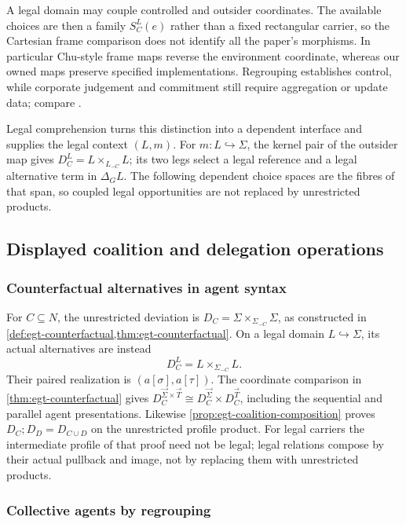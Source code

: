 \documentclass[11pt,a4paper]{article}
\numberwithin{equation}{section}
\theoremstyle{definition}
\theoremstyle{remark}
\theoremstyle{plain}
\providecommand{\sig}{\vec{\Sigma}}
\providecommand{\taus}{\vec{T}}
\begin{document}
A legal domain may couple controlled and outsider coordinates. The
available choices are then a family $S_C^L(e)$ rather than a fixed
rectangular carrier, so the Cartesian frame comparison does not identify
all the paper's morphisms. In particular Chu-style frame maps reverse the
environment coordinate, whereas our owned maps preserve specified
implementations. Regrouping establishes control, while corporate
judgement and commitment still require aggregation or update data; compare
\citet{ListPettit2011GroupAgency}.

Legal comprehension turns this distinction into a dependent
interface and supplies the legal context $(L,m)$. For
$m:L\hookrightarrow\Sigma$, the kernel pair of the
outsider map gives
$D_C^L=L\times_{L_{-C}}L$; its two legs select a legal reference
and a legal alternative term in $\Delta_GL$. The following dependent
choice spaces are the
fibres of that span, so coupled legal opportunities are not replaced by
unrestricted products.

\subsection{Displayed coalition and delegation operations}
\label{agt-sec-ownership}

\subsubsection{Counterfactual alternatives in agent syntax}

For $C\subseteq N$, the unrestricted deviation is
$D_C=\Sigma\times_{\Sigma_{-C}}\Sigma$, as constructed in
\cref{def:egt-counterfactual,thm:egt-counterfactual}.
On a legal domain $L\hookrightarrow\Sigma$, its actual alternatives
are instead
\begin{equation}
 D_C^L=L\times_{\Sigma_{-C}}L.
 \label{agt-eq-legal-deviation}
\end{equation}
Their paired realization is $(a[\sigma],a[\tau])$.
The coordinate comparison in \cref{thm:egt-counterfactual} gives
$D_C^{\sig\times\taus}\cong D_C^{\sig}\times D_C^{\taus}$,
including the sequential and parallel agent presentations. Likewise
\cref{prop:egt-coalition-composition} proves
$D_C;D_D=D_{C\cup D}$ on the unrestricted profile product.
For legal carriers the intermediate profile of that proof need not be
legal; legal relations compose by their actual pullback and image,
not by replacing them with unrestricted products.

\subsubsection{Collective agents by regrouping}
\end{document}
